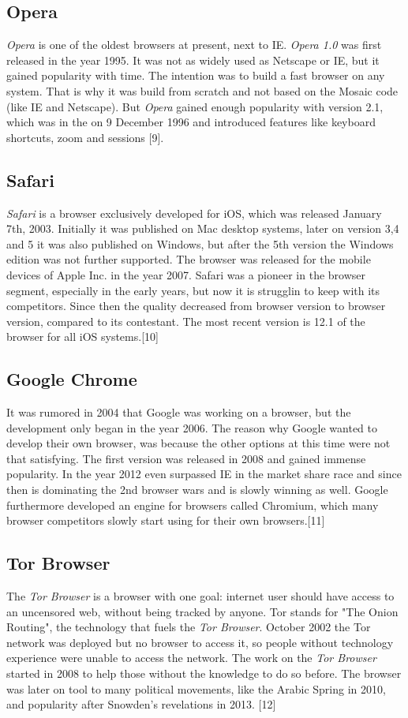 \documentclass[runningheads]{llncs}
\begin{document}
		\subsection{Opera}
		\textit{Opera} is one of the oldest browsers at present, next to IE. \textit{Opera 1.0} was first released in the year 1995. It was not as widely used as Netscape or IE, but it gained popularity with time. The intention was to build a fast browser on any system. That is why it was build from scratch and not based on the Mosaic code (like IE and Netscape). But \textit{Opera} gained enough popularity with version 2.1, which was in the on 9 December 1996 and introduced features like keyboard shortcuts, zoom and sessions [9].
		\subsection{Safari}
		\textit{Safari} is a browser exclusively developed for iOS, which was released January 7th, 2003. Initially it was published on Mac desktop systems, later on version 3,4 and 5 it was also published on Windows, but after the 5th version the Windows edition was not further supported. The browser was released for the mobile devices of Apple Inc. in the year 2007. Safari was a pioneer in the browser segment, especially in the early years, but now it is strugglin to keep with its competitors. Since then the quality decreased from browser version to browser version, compared to its contestant. The most recent version is 12.1 of the browser for all iOS systems.[10]
		\subsection{Google Chrome}
		It was rumored in 2004 that Google was working on a browser, but the development only began in the year 2006. The reason why Google wanted to develop their own browser, was because the other options at this time were not that satisfying. The first version was released in 2008 and gained immense popularity. In the year 2012 even surpassed IE in the market share race and since then is dominating the 2nd browser wars and is slowly winning as well. Google furthermore developed an engine for browsers called Chromium, which many browser competitors slowly start using for their own browsers.[11]
		\subsection{Tor Browser}
		The \textit{Tor Browser} is a browser with one goal: internet user should have access to an uncensored web, without being tracked by anyone. Tor stands for "The Onion Routing", the technology that fuels the \textit{Tor Browser}. October 2002 the Tor network was deployed but no browser to access it, so people without technology experience were unable to access the network. The work on the \textit{Tor Browser} started in 2008 to help those without the knowledge to do so before. The browser was later on tool to many political movements, like the Arabic Spring in 2010, and popularity after Snowden's revelations in 2013. [12]
\end{document}
